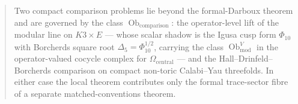 \begin{abstract}
\medskip\noindent
Two compact comparison problems lie beyond the formal-Darboux theorem
and are governed by the class
\(\operatorname{Ob}_{\mathrm{comparison}}\): the operator-level lift of the
modular line on $K3\times E$ --- whose scalar shadow is the Igusa cusp
form \(\Phi_{10}\) with Borcherds square root \(\Delta_5=\Phi_{10}^{1/2}\),
carrying the class \(\operatorname{Ob}^V_{\mathrm{mod}}\) in the
operator-valued cocycle complex for \(\Omega_{\mathrm{central}}\) ---
and the
Hall--Drinfeld--Borcherds comparison on compact non-toric Calabi--Yau
threefolds.  In either case the local theorem contributes only the
formal trace-sector fibre of a separate matched-conventions theorem.

\end{abstract}
